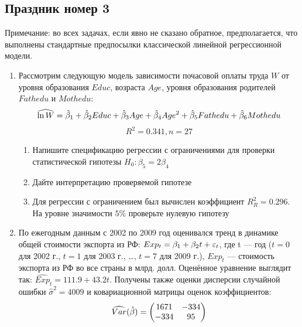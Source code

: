 \documentclass[12pt, a4paper]{article}
\begin{document}
\subsection{Праздник номер 3}
Примечание: во всех задачах, если явно не сказано обратное, предполагается, что выполнены стандартные предпосылки классической линейной регрессионной модели.

\begin{enumerate}

\item  Рассмотрим следующую модель зависимости почасовой оплаты труда $W$ от уровня образования $Educ$, возраста $Age$, уровня образования родителей $Fathedu$ и $Mothedu$:
\[
\widehat{\ln W} = \hat{\beta}_1 + \hat{\beta}_2 Educ + \hat{\beta}_3 Age + \hat{\beta}_4 Age^2+ \hat{\beta}_5 Fathedu + \hat{\beta}_6 Mothedu
\]
\[
R^2 = 0.341, n = 27
\]
\begin{enumerate}
\item Напишите спецификацию регрессии с ограничениями для проверки статистической гипотезы $H_0: \beta_5 = 2\beta_4$
\item Дайте интерпретацию проверяемой гипотезе
\item Для регрессии с ограничением был вычислен коэффициент $R_{R}^2 = 0.296$. На уровне значимости $5\%$ проверьте нулевую гипотезу
\end{enumerate}



\item По ежегодным данным с 2002 по 2009 год оценивался тренд в динамике общей стоимости экспорта из РФ: $Exp_t=\beta_1+\beta_2t+\varepsilon_t$, где t — год ($t=0$ для 2002 г., $t=1$ для 2003 г., \ldots, $t=7$
для 2009 г.), $Exp_t$ — стоимость экспорта из РФ во все страны в млрд. долл. Оценённое уравнение  выглядит так: $\widehat{Exp}_t=111.9+43.2t$. Получены также оценки дисперсии случайной ошибки $\hat{\sigma}^2=4009$ и ковариационной матрицы оценок коэффициентов:
\[
\widehat{Var}(\hat{\beta})=\begin{pmatrix}
1671 & -334 \\
-334 & 95
\end{pmatrix}
\]


\end{enumerate}
\end{document}
